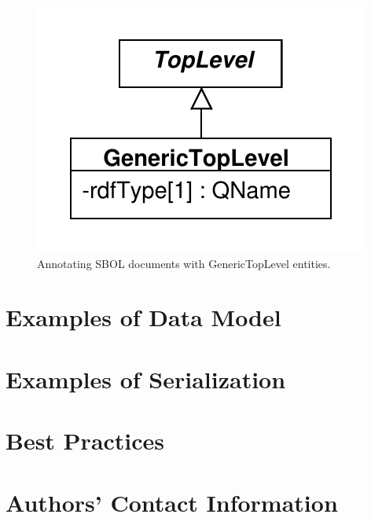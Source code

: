 \documentclass[draftspec]{sbmlpkgspec}
\begin{document}
\begin{figure}[!ht]
\begin{center}
\includegraphics[scale=0.8]{uml/generictoplevel}
\caption[]{Annotating SBOL documents with GenericTopLevel entities.}
\label{uml:generictoplevel}
\end{center}
\end{figure}


\section{Examples of Data Model}



\section{Examples of Serialization}

\section{Best Practices}



\section{Authors' Contact Information}
\end{document}
